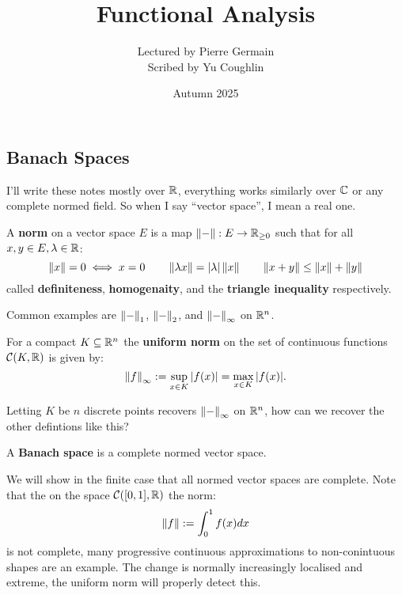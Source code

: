 \documentclass{article}
\begin{document}
\title{Functional Analysis}
\author{Lectured by Pierre Germain \\
Scribed by Yu Coughlin}
\date{Autumn 2025}

\maketitle

\tableofcontents

\subsection{Banach Spaces}

I'll write these notes mostly over $\mathbb{R}$, everything works similarly over $\mathbb{C}$ or any complete normed field. So when I say ``vector space'', I mean a real one.

\begin{definition}
    A \textbf{norm} on a vector space $E$ is a map $\left\lVert - \right\rVert:E\rightarrow \mathbb{R}_{\geq0}$ such that for all $x,y\in E,\lambda \in \mathbb{R}$: \[
    \left\lVert x \right\rVert=0 \iff x = 0 \qquad \left\lVert \lambda x \right\rVert=\left| \lambda \right|\left\lVert x \right\rVert \qquad \left\lVert x+y \right\rVert \leq \left\lVert x \right\rVert + \left\lVert y \right\rVert
    \] called \textbf{definiteness}, \textbf{homogenaity}, and the \textbf{triangle inequality} respectively.
\end{definition}

Common examples are $\left\lVert - \right\rVert_1$, $\left\lVert - \right\rVert_2$, and $\left\lVert - \right\rVert_\infty$ on $\mathbb{R}^n$.

\begin{definition}
    For a compact $K\subseteq \mathbb{R}^n$ the \textbf{uniform norm} on the set of continuous functions $\mathcal{C}(K,\mathbb{R})$ is given by: \[
    \left\lVert f \right\rVert_\infty := \sup_{x\in K}|f(x)| = \max_{x\in K}|f(x)|.
    \]
\end{definition}

Letting $K$ be $n$ discrete points recovers $\left\lVert - \right\rVert_\infty$ on $\mathbb{R}^n$, how can we recover the other defintions like this?

\begin{definition}
    A \textbf{Banach space} is a complete normed vector space.
\end{definition}

We will show in the finite case that all normed vector spaces are complete. Note that the on the space $\mathcal{C}([0,1],\mathbb{R})$ the norm: \[
    \left\lVert f \right\rVert := \int_0^1f(x)dx
\] is not complete, many progressive continuous approximations to non-conintuous shapes are an example. The change is normally increasingly localised and extreme, the uniform norm will properly detect this.
\end{document}
